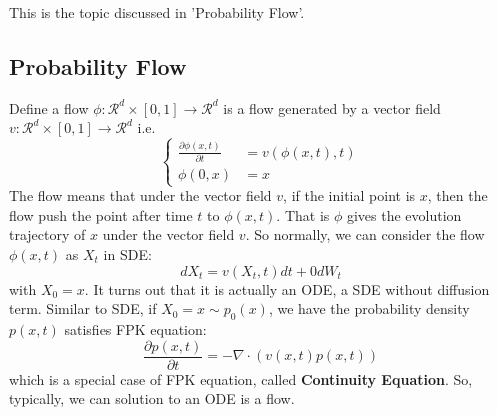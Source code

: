 \documentclass{article}
\begin{document}
This is the topic discussed in 'Probability Flow'.
\subsection{Probability Flow}
Define a flow $\phi: \mathcal{R}^d\times [0, 1]\rightarrow \mathcal{R}^d$ is a flow generated by a vector field $v: \mathcal{R}^d \times [0, 1]\rightarrow \mathcal{R}^d$ i.e.
\begin{equation}\left\{
    \begin{aligned}
        \frac{\partial \phi(x, t)}{\partial t} &= v(\phi(x, t), t)\\
        \phi(0, x)&=x
    \end{aligned}\right.
\end{equation}
The flow means that under the vector field $v$, if the initial point is $x$, then the flow push the point after time $t$ to $\phi(x, t)$. That is $\phi$ gives the evolution trajectory of $x$ under the vector field $v$.
So normally, we can consider the flow $\phi(x, t)$ as $X_t$ in SDE:
\begin{equation}
    dX_t = v(X_t, t)dt + 0dW_t
\end{equation}
with $X_0=x$. It turns out that it is actually an ODE, a SDE without diffusion term. Similar to SDE, if $X_0=x\sim p_0(x)$, we have the probability density $p(x, t)$ satisfies FPK equation:
\begin{equation}
    \frac{\partial p(x, t)}{\partial t}=-\nabla\cdot\left(v(x, t)p(x, t)\right)
\end{equation}
which is a special case of FPK equation, called \textbf{Continuity Equation}. So, typically, we can solution to an ODE is a flow.
\end{document}

